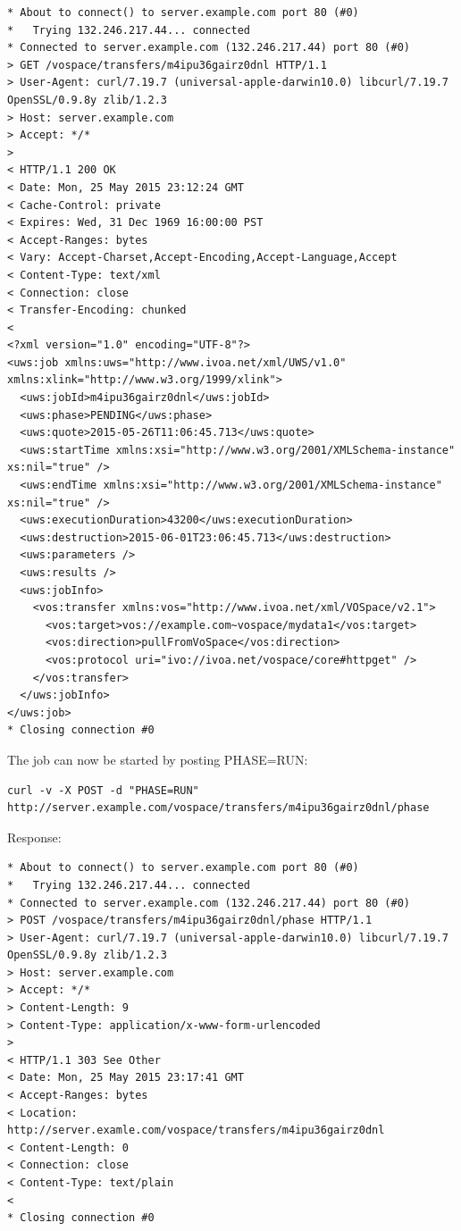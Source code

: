 \documentclass[11pt,a4paper]{ivoa}
\begin{document}
\begin{lstlisting}
* About to connect() to server.example.com port 80 (#0)
*   Trying 132.246.217.44... connected
* Connected to server.example.com (132.246.217.44) port 80 (#0)
> GET /vospace/transfers/m4ipu36gairz0dnl HTTP/1.1
> User-Agent: curl/7.19.7 (universal-apple-darwin10.0) libcurl/7.19.7 OpenSSL/0.9.8y zlib/1.2.3
> Host: server.example.com
> Accept: */*
>
< HTTP/1.1 200 OK
< Date: Mon, 25 May 2015 23:12:24 GMT
< Cache-Control: private
< Expires: Wed, 31 Dec 1969 16:00:00 PST
< Accept-Ranges: bytes
< Vary: Accept-Charset,Accept-Encoding,Accept-Language,Accept
< Content-Type: text/xml
< Connection: close
< Transfer-Encoding: chunked
<
<?xml version="1.0" encoding="UTF-8"?>
<uws:job xmlns:uws="http://www.ivoa.net/xml/UWS/v1.0" xmlns:xlink="http://www.w3.org/1999/xlink">
  <uws:jobId>m4ipu36gairz0dnl</uws:jobId>
  <uws:phase>PENDING</uws:phase>
  <uws:quote>2015-05-26T11:06:45.713</uws:quote>
  <uws:startTime xmlns:xsi="http://www.w3.org/2001/XMLSchema-instance" xs:nil="true" />
  <uws:endTime xmlns:xsi="http://www.w3.org/2001/XMLSchema-instance" xs:nil="true" />
  <uws:executionDuration>43200</uws:executionDuration>
  <uws:destruction>2015-06-01T23:06:45.713</uws:destruction>
  <uws:parameters />
  <uws:results />
  <uws:jobInfo>
    <vos:transfer xmlns:vos="http://www.ivoa.net/xml/VOSpace/v2.1">
      <vos:target>vos://example.com~vospace/mydata1</vos:target>
      <vos:direction>pullFromVoSpace</vos:direction>
      <vos:protocol uri="ivo://ivoa.net/vospace/core#httpget" />
    </vos:transfer>
  </uws:jobInfo>
</uws:job>
* Closing connection #0
\end{lstlisting}
The job can now be started by posting PHASE=RUN:
\begin{lstlisting}
curl -v -X POST -d "PHASE=RUN" http://server.example.com/vospace/transfers/m4ipu36gairz0dnl/phase
\end{lstlisting}
Response:
\begin{lstlisting}
* About to connect() to server.example.com port 80 (#0)
*   Trying 132.246.217.44... connected
* Connected to server.example.com (132.246.217.44) port 80 (#0)
> POST /vospace/transfers/m4ipu36gairz0dnl/phase HTTP/1.1
> User-Agent: curl/7.19.7 (universal-apple-darwin10.0) libcurl/7.19.7 OpenSSL/0.9.8y zlib/1.2.3
> Host: server.example.com
> Accept: */*
> Content-Length: 9
> Content-Type: application/x-www-form-urlencoded
>
< HTTP/1.1 303 See Other
< Date: Mon, 25 May 2015 23:17:41 GMT
< Accept-Ranges: bytes
< Location: http://server.examle.com/vospace/transfers/m4ipu36gairz0dnl
< Content-Length: 0
< Connection: close
< Content-Type: text/plain
<
* Closing connection #0
\end{lstlisting}
\end{document}
